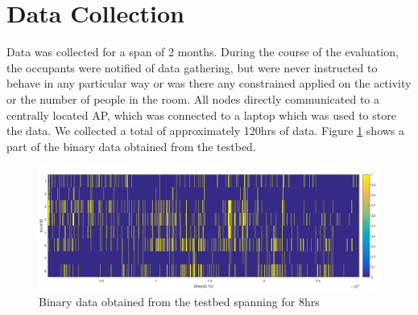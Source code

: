 \section{Data Collection}
Data was collected for a span of 2 months. During the course of the evaluation, the occupants were notified of data gathering, but were never instructed to behave in any particular way or was there any constrained applied on the activity or the number of people in the room. All nodes directly communicated to a centrally located AP, which was connected to a laptop which was used to store the data. We collected a total of approximately 120hrs of data. Figure \ref{fig:dataFig} shows a part of the binary data obtained from the testbed.
\begin{figure}[!ht]
\includegraphics[width=\textwidth]{./pics/data.png}
\caption{Binary data obtained from the testbed spanning for 8hrs}
\centering
\label{fig:dataFig}
\end{figure}



